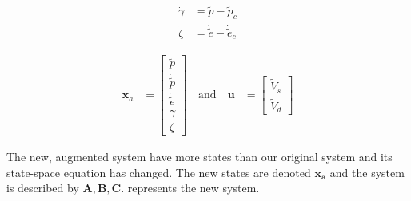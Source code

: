 \begin{equation}\label{eq:integral_states}
    \begin{aligned}
        \dot{\gamma} &= \tilde{p} - \tilde{p}_c \\
        \dot{\zeta} &= \dot{\tilde{e}} - \dot{\tilde{e}}_c
    \end{aligned}
\end{equation}

\begin{equation}\label{eq:states_withIntegral}
    \begin{aligned}
        \mathbf{x}_a &= 
        \begin{bmatrix}
            \tilde{p} \\ \dot{\tilde{p}} \\ \dot{\tilde{e}} \\ \gamma \\ \zeta
        \end{bmatrix}
        \quad \textrm{and} \quad
        \mathbf{u} &=
        \begin{bmatrix}
            \tilde{V}_s \\ \tilde{V}_d
        \end{bmatrix}
    \end{aligned}
\end{equation}

The new, augmented system have more states than our original system and its state-space equation has changed. The new states are denoted $\mathbf{x_a}$ and the system is described by $\mathbf{\bar{A}}, \mathbf{\bar{B}}, \mathbf{\bar{C}}$.  represents the new system.

